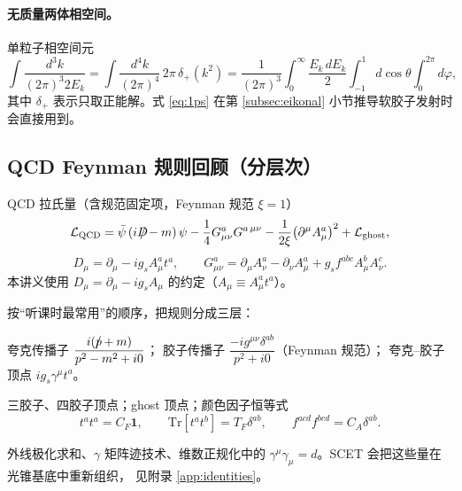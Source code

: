 \documentclass[UTF8,a4paper,11pt]{ctexart}
\theoremstyle{definition}
\theoremstyle{remark}
\theoremstyle{plain}
\newcommand{\Dsl}{D\mkern-11.5mu/}
\newcommand{\psl}{p\mkern-9.5mu/}
\newcommand{\CF}{C_F}
\newcommand{\CA}{C_A}
\newcommand{\TF}{T_F}
\newcommand{\Tr}{\mathrm{Tr}}
\begin{document}
\paragraph{无质量两体相空间。}
单粒子相空间元
\begin{equation}
  \int\!\frac{d^3k}{(2\pi)^3 2E_k}
  =\int\!\frac{d^4k}{(2\pi)^4}\,2\pi\,\delta_+(k^2)
  =\frac{1}{(2\pi)^3}\int_0^\infty \frac{E_k\,dE_k}{2}
    \int_{-1}^{1}d\cos\theta\int_0^{2\pi}\!d\varphi ,
  \label{eq:1ps}
\end{equation}
其中 $\delta_+$ 表示只取正能解。式 \eqref{eq:1ps} 在第 \ref{subsec:eikonal}
小节推导软胶子发射时会直接用到。

\subsection{QCD Feynman 规则回顾（分层次）}
\label{subsec:feynman}

QCD 拉氏量（含规范固定项，Feynman 规范 $\xi=1$）
\begin{equation}
  \mathcal L_{\rm QCD}
  =\bar\psi\,(i\Dsl-m)\,\psi
   -\frac14 G^a_{\mu\nu}G^{a\,\mu\nu}
   -\frac{1}{2\xi}\big(\partial^\mu A^a_\mu\big)^2
   +\mathcal L_{\rm ghost},
\end{equation}
\begin{equation}
  D_\mu=\partial_\mu-ig_s A^a_\mu t^a ,
  \qquad
  G^a_{\mu\nu}=\partial_\mu A^a_\nu-\partial_\nu A^a_\mu
                +g_s f^{abc}A^b_\mu A^c_\nu .
\end{equation}
本讲义使用 $D_\mu=\partial_\mu-ig_sA_\mu$ 的约定（$A_\mu\equiv A_\mu^a t^a$）。

按“听课时最常用”的顺序，把规则分成三层：

\begin{description}[leftmargin=1.2cm,style=nextline]
\item[第一层（必须秒答）]
  夸克传播子 $\dfrac{i(\psl+m)}{p^2-m^2+i0}$；
  胶子传播子 $\dfrac{-i g^{\mu\nu}\delta^{ab}}{p^2+i0}$（Feynman 规范）；
  夸克--胶子顶点 $ig_s\gamma^\mu t^a$。
\item[第二层（会用即可）]
  三胶子、四胶子顶点；ghost 顶点；颜色因子恒等式
  \begin{equation}
    t^at^a=\CF\mathbf 1,\qquad
    \Tr[t^at^b]=\TF\delta^{ab},\qquad
    f^{acd}f^{bcd}=\CA\delta^{ab} .
  \end{equation}
\item[第三层（SCET 里会被“重写”）]
  外线极化求和、$\gamma$ 矩阵迹技术、维数正规化中的
  $\gamma^\mu\gamma_\mu=d$。SCET 会把这些量在光锥基底中重新组织，
  见附录 \ref{app:identities}。
\end{description}
\end{document}
